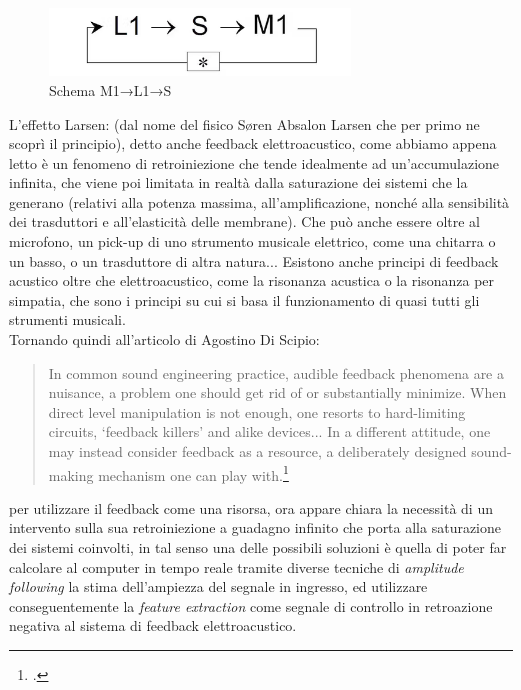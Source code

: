 \begin{figure}[h!]
    \begin{center}
        \vspace{0.5cm}
        \includegraphics[width=8cm]{figures/larsen_Feedback_scheme.png}
        \caption{Schema M1→L1→S}
        \vspace{0.5cm}
        \end{center}
\end{figure} 

L'effetto Larsen: (dal nome del fisico Søren Absalon Larsen
che per primo ne scoprì il principio), detto anche feedback elettroacustico,
come abbiamo appena letto è un fenomeno di retroiniezione che tende idealmente 
ad un'accumulazione infinita, che viene poi limitata in realtà dalla saturazione dei sistemi 
che la generano (relativi alla potenza massima, all'amplificazione, nonché alla sensibilità dei
trasduttori e all'elasticità delle membrane). Che può anche essere oltre al microfono, un
pick-up di uno strumento musicale elettrico, come una chitarra o un basso, o un trasduttore di
altra natura... 
Esistono anche principi di feedback acustico oltre che elettroacustico, 
come la risonanza acustica o la risonanza per simpatia,
che sono i principi su cui si basa il funzionamento di quasi tutti gli strumenti musicali. \\
Tornando quindi all'articolo di Agostino Di Scipio:

\begin{quote}
In common sound engineering practice, audible feedback phenomena are a nuisance, a problem one
should get rid of or substantially minimize. When direct level manipulation is not enough, one
resorts to hard-limiting circuits, ‘feedback killers’ and alike devices... 
In a different attitude, one may instead consider feedback as
a resource, a deliberately designed sound-making mechanism one can play with.\footcite{di_scipio_relational_2022}
\end{quote}

per utilizzare il feedback come una risorsa,
ora appare chiara la necessità di un intervento sulla sua retroiniezione a guadagno infinito 
che porta alla saturazione dei sistemi coinvolti, 
in tal senso una delle possibili soluzioni è quella di poter far calcolare
al computer in tempo reale tramite diverse tecniche di \textit{amplitude following} la stima dell'ampiezza
del segnale in ingresso, ed utilizzare conseguentemente la \textit{feature extraction} 
come segnale di controllo in retroazione negativa al sistema di feedback elettroacustico.

